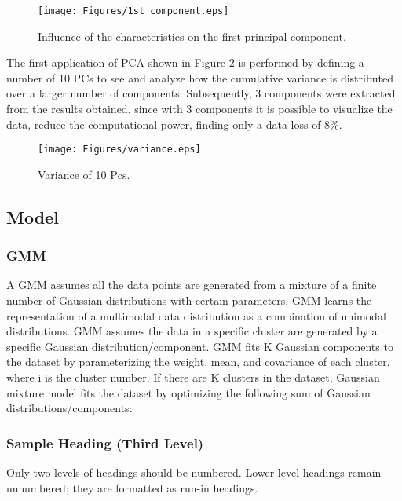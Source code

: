 \documentclass[runningheads]{llncs}
\begin{document}
\clearpage

\begin{figure}[h]
    \begin{adjustwidth}{-0.7in}{0in}
        \texttt{[image: Figures/1st\_component.eps]}
        \caption{Influence of the characteristics on the first principal component.}
        \label{fig4}
    \end{adjustwidth}
\end{figure}

The first application of PCA shown in Figure \ref{fig5} is performed by defining a number of 10 PCs to see and analyze how the cumulative variance is distributed over a larger number of components.
Subsequently, 3 components were extracted from the results obtained, since with 3 components it is possible to visualize the data, reduce the computational power, finding only a data loss of 8\%.

\begin{figure}[h]
        \centering
        \texttt{[image: Figures/variance.eps]}
        \caption{Variance of 10 Pcs.}
        \label{fig5}
\end{figure}

\clearpage

\subsection{Model}
\subsubsection{GMM}
A GMM assumes all the data points are generated from a mixture of a finite number of Gaussian 
distributions with certain parameters. GMM learns the representation of a multimodal data 
distribution as a combination of unimodal distributions. GMM assumes the data in a specific 
cluster are generated by a specific Gaussian distribution/component. GMM fits K Gaussian components 
to the dataset by parameterizing the weight, mean, and covariance of each cluster, where i is the 
cluster number. If there are K clusters in the dataset, Gaussian mixture model fits the dataset by 
optimizing the following sum of Gaussian distributions/components:

\subsubsection{Sample Heading (Third Level)} Only two levels of
headings should be numbered. Lower level headings remain unnumbered;
they are formatted as run-in headings.
\end{document}
